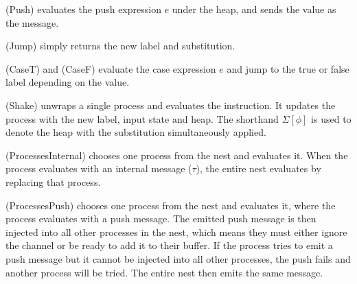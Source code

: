 (Push) evaluates the push expression $e$ under the heap, and sends the value as the message.

(Jump) simply returns the new label and substitution.

(CaseT) and (CaseF) evaluate the case expression $e$ and jump to the true or false label depending on the value.

(Shake) unwraps a single process and evaluates the instruction.
It updates the process with the new label, input state and heap.
The shorthand $\Sigma[\phi]$ is used to denote the heap with the substitution simultaneously applied.

(ProcessesInternal) chooses one process from the nest and evaluates it.
When the process evaluates with an internal message ($\tau$), the entire nest evaluates by replacing that process.

(ProcessesPush) chooses one process from the nest and evaluates it, where the process evaluates with a push message.
The emitted push message is then injected into all other processes in the nest, which means they must either ignore the channel or be ready to add it to their buffer.
If the process tries to emit a push message but it cannot be injected into all other processes, the push fails and another process will be tried.
The entire nest then emits the same message.

